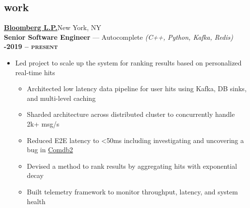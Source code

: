 \documentclass[margin,10pt]{res/res}
\begin{document}
\begin{resume}
\section{\sc \lsstyle work}
    \href{https://www.bloomberg.com/company/careers/working-here/engineering/}{\textbf{\large{} Bloomberg L.P.}}\hfill New York, NY\\
    \textbf{Senior Software Engineer} --- Autocomplete
    \textit{(C++, Python, Kafka, Redis)}\hfill
    \textsc{\bfseries{}-2019 -- present}
    \vspace{0.5em}
    \begin{itemize}
        \item Led project to scale up the system for ranking results based on personalized real-time hits
        \begin{itemize}
            \item Architected low latency data pipeline for user hits using Kafka, DB sinks, and multi-level caching
            \item Sharded architecture across distributed cluster to concurrently handle 2k+ msg/s
            \item Reduced E2E latency to <50ms including investigating and uncovering a bug in \href{https://en.wikipedia.org/wiki/Comdb2/}{Comdb2}
            \item Devised a method to rank results by aggregating hits with exponential decay
            \item Built telemetry framework to monitor throughput, latency, and system health

\end{itemize}
\end{itemize}
\end{resume}
\end{document}
